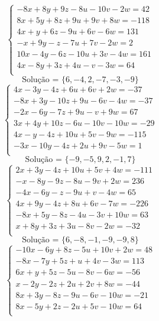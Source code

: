 \documentclass[12pt,oneside,a4paper]{article}
\begin{document}
\vspace{\baselineskip}
\begin{equation*}
\begin{cases}
-8x+8y+9z-8u-10v-2w=42 \\
8x+5y+8z+9u+9v+8w=-118 \\
4x+y+6z-9u+6v-6w=131 \\
-x+9y-z-7u+7v-2w=2 \\
10x-4y-6z-10u+3v-4w=161 \\
4x-8y+3z+4u-v-3w=64 \\
\end{cases}
\end{equation*}
\begin{equation*}
\text{Solução = }\{6,-4,2,-7,-3,-9\}
\end{equation*}
\vspace{\baselineskip}
\begin{equation*}
\begin{cases}
4x-3y-4z+6u+6v+2w=-37 \\
-8x+3y-10z+9u-6v-4w=-37 \\
-2x-6y-7z+9u-v+9w=67 \\
3x+4y+10z-6u-10v-10w=-29 \\
4x-y-4z+10u+5v-9w=-115 \\
-3x-10y-4z+2u+9v-5w=1 \\
\end{cases}
\end{equation*}
\begin{equation*}
\text{Solução = }\{-9,-5,9,2,-1,7\}
\end{equation*}
\vspace{\baselineskip}
\begin{equation*}
\begin{cases}
2x+3y-4z+10u+5v+4w=-111 \\
-x-8y-9z-8u-9v+2w=236 \\
-4x-6y-z-9u+v-4w=65 \\
4x+9y-4z+8u+6v-7w=-226 \\
-8x+5y-8z-4u-3v+10w=63 \\
x+8y+3z+3u-8v-2w=-32 \\
\end{cases}
\end{equation*}
\begin{equation*}
\text{Solução = }\{6,-8,-1,-9,-9,8\}
\end{equation*}
\vspace{\baselineskip}
\begin{equation*}
\begin{cases}
-10x-6y+8z-5u+10v+2w=48 \\
-8x-7y+5z+u+4v-3w=113 \\
6x+y+5z-5u-8v-6w=-56 \\
x-2y-2z+2u+2v+8w=-44 \\
8x+3y-8z-9u-6v-10w=-21 \\
8x-5y+2z-2u+5v-10w=64 \\
\end{cases}
\end{equation*}
\end{document}
